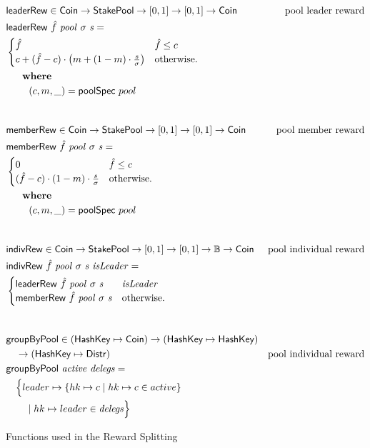 \begin{figure}[htb]
  \begin{align*}
      & \fun{leaderRew} \in \Coin \to \StakePool \to [0, 1] \to [0, 1] \to \Coin
      & \text{pool leader reward} \\
      & \fun{leaderRew}~\hat{f}~\var{pool}~\sigma~\var{s} = \\
      & \begin{cases}
          \hat{f} & \hat{f} \leq c\\
          c + (\hat{f} - c)\cdot\left(m + (1-m)\cdot\frac{s}{\sigma}\right) &
          \text{otherwise.}
        \end{cases} \\
      & ~~~\where \\
      & ~~~~~~~(c, m, \_) = \fun{poolSpec}~pool \\
      \nextdef
      & \fun{memberRew} \in \Coin \to \StakePool \to [0, 1] \to [0, 1] \to \Coin
      & \text{pool member reward} \\
      & \fun{memberRew}~\hat{f}~\var{pool}~\sigma~\var{s} = \\
      & \begin{cases}
          0 & \hat{f} \leq c\\
          (\hat{f} - c)\cdot(1-m)\cdot\frac{s}{\sigma} &
          \text{otherwise.}
        \end{cases} \\
      & ~~~\where \\
      & ~~~~~~~(c, m, \_) = \fun{poolSpec}~pool \\
      \nextdef
      & \fun{indivRew} \in \Coin \to \StakePool \to [0, 1] \to [0, 1] \to \mathbb{B} \to \Coin
      & \text{pool individual reward} \\
      & \fun{indivRew}~\hat{f}~\var{pool}~\sigma~\var{s}~\var{isLeader} = \\
      & \begin{cases}
          \fun{leaderRew}~\hat{f}~\var{pool}~\sigma~\var{s} & \var{isLeader} \\
        \fun{memberRew}~\hat{f}~\var{pool}~\sigma~\var{s} & \text{otherwise.}
        \end{cases} \\
      \nextdef
      & \fun{groupByPool} \in (\HashKey \mapsto \Coin) \to (\HashKey \mapsto \HashKey) \\
      & ~~~\to (\HashKey \mapsto \Distr)
      & \text{pool individual reward} \\
      & \fun{groupByPool}~\var{active}~\var{delegs} = \\
      & ~~~\Big\{ leader \mapsto
      \{hk \mapsto c \mid hk \mapsto c \in active\} \\
      & ~~~~~~            \mid hk \mapsto leader\in\var{delegs} \Big\}
  \end{align*}
  \caption{Functions used in the Reward Splitting}
  \label{fig:functions:reward-splitting}
\end{figure}



